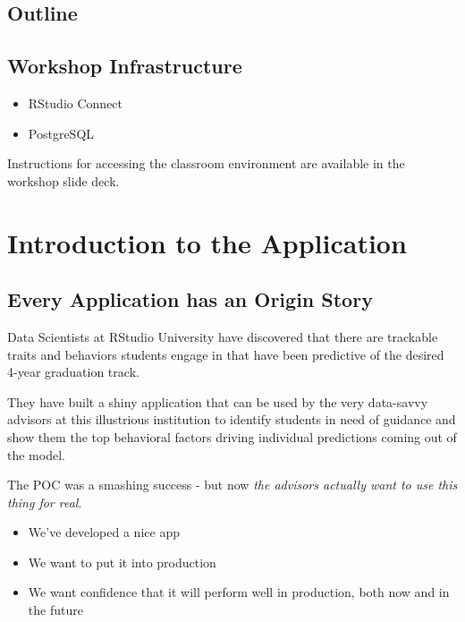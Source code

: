 \documentclass[]{book}
\providecommand{\tightlist}{%
  \setlength{\itemsep}{0pt}\setlength{\parskip}{0pt}}
\theoremstyle{definition}
\theoremstyle{definition}
\theoremstyle{definition}
\theoremstyle{remark}
\begin{document}
\hypertarget{outline}{%
\section{Outline}\label{outline}}

\hypertarget{workshop-infrastructure}{%
\section{Workshop Infrastructure}\label{workshop-infrastructure}}

\begin{itemize}
\tightlist
\item
  RStudio Connect
\item
  PostgreSQL
\end{itemize}

Instructions for accessing the classroom environment are available in
the workshop slide deck.

\hypertarget{app-intro}{%
\chapter{Introduction to the Application}\label{app-intro}}

\hypertarget{every-application-has-an-origin-story}{%
\section{Every Application has an Origin
Story}\label{every-application-has-an-origin-story}}

Data Scientists at RStudio University have discovered that there are
trackable traits and behaviors students engage in that have been
predictive of the desired 4-year graduation track.

They have built a shiny application that can be used by the very
data-savvy advisors at this illustrious institution to identify students
in need of guidance and show them the top behavioral factors driving
individual predictions coming out of the model.

The POC was a smashing success - but now \emph{the advisors actually
want to use this thing for real}.

\begin{itemize}
\tightlist
\item
  We've developed a nice app
\item
  We want to put it into production
\item
  We want confidence that it will perform well in production, both now
  and in the future
\end{itemize}
\end{document}
